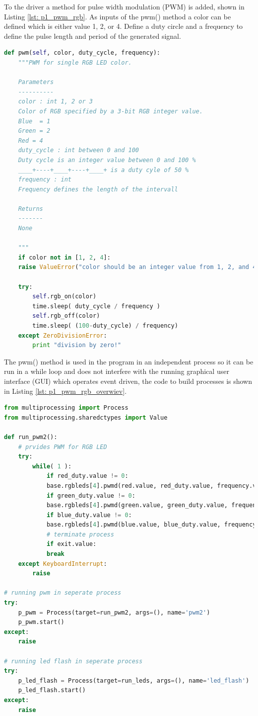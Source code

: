 To the driver a method for pulse width modulation (PWM) is added, shown in Listing \ref{lst: p1_pwm_rgb}. As inputs of the pwm() method a color can be defined which is either value 1, 2, or 4. Define a duty circle and a frequency to define the pulse length and period of the generated signal.
\begin{lstlisting}[style=PythonStyle, language=Python, caption={RGB LED driver PWM  method.},label=lst: p1_pwm_rgb]
def pwm(self, color, duty_cycle, frequency):    
    """PWM for single RGB LED color.
    
    Parameters
    ----------
    color : int 1, 2 or 3
    Color of RGB specified by a 3-bit RGB integer value.
    Blue  = 1
    Green = 2
    Red = 4
    duty_cycle : int between 0 and 100
    Duty cycle is an integer value between 0 and 100 %
    ____+----+____+----+____+ is a duty cyle of 50 %
    frequency : int
    Frequency defines the length of the intervall
    
    Returns
    -------
    None
    
    """        
    if color not in [1, 2, 4]:
    raise ValueError("color should be an integer value from 1, 2, and 4.")
    
    try:
        self.rgb_on(color)
        time.sleep( duty_cycle / frequency )
        self.rgb_off(color)
        time.sleep( (100-duty_cycle) / frequency)   
    except ZeroDivisionError:
        print "division by zero!"
\end{lstlisting}

The pwm() method is used in the program in an independent process so it can be run in a while loop and does not interfere with the running graphical user interface (GUI) which operates event driven, the code to build processes is shown in Listing \ref{lst: p1_pwm_rgb_overwiev}. 

\begin{lstlisting}[style=PythonStyle, language=Python, caption={RGB LED driver PWM overwiev.},label=lst: p1_pwm_rgb_overwiev]
from multiprocessing import Process
from multiprocessing.sharedctypes import Value
    
def run_pwm2():  
	# prvides PWM for RGB LED        
	try:           
		while( 1 ):
			if red_duty.value != 0:
			base.rgbleds[4].pwmd(red.value, red_duty.value, frequency.value)
			if green_duty.value != 0:
			base.rgbleds[4].pwmd(green.value, green_duty.value, frequency.value)
			if blue_duty.value != 0:
			base.rgbleds[4].pwmd(blue.value, blue_duty.value, frequency.value)
			# terminate process
			if exit.value:
			break
	except KeyboardInterrupt:
		raise

# running pwm in seperate process
try:           
	p_pwm = Process(target=run_pwm2, args=(), name='pwm2')
	p_pwm.start()
except:
	raise

# running led flash in seperate process
try:           
	p_led_flash = Process(target=run_leds, args=(), name='led_flash')
	p_led_flash.start()
except:
	raise
\end{lstlisting}


